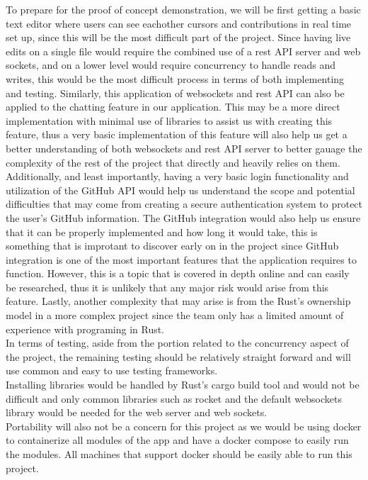 \documentclass{article}
\begin{document}
To prepare for the proof of concept demonstration, we will be first getting a basic text editor where users can see eachother cursors and contributions in real time set up, since this will be the most difficult part of the project.
Since having live edits on a single file would require the combined use of a rest API server and web sockets, and on a lower level would require concurrency to handle reads and writes, this would be the most difficult process in terms of 
both implementing and testing. Similarly, this application of websockets and rest API can also be applied to the chatting feature in our application. This may be a more direct implementation with minimal use of libraries to assist us with
creating this feature, thus a very basic implementation of this feature will also help us get a better understanding of both websockets and rest API server to better gauage the complexity of the rest of the project that directly and heavily
relies on them. Additionally, and least importantly, having a very basic login functionality and utilization of the GitHub API would help us understand the scope and potential difficulties that may come from creating a secure authentication
system to protect the user's GitHub information. The GitHub integration would also help us ensure that it can be properly implemented and how long it would take, this is something that is improtant to discover early on in the project since 
GitHub integration is one of the most important features that the application requires to function. However, this is a topic that is covered in depth online and can easily be researched, thus it is unlikely that any major risk would arise 
from this feature. Lastly, another complexity that may arise is from the Rust's ownership model in a more complex project since the team only has a limited amount of experience with programing in Rust.\\

In terms of testing, aside from the portion related to the concurrency aspect of the project, the remaining testing should be relatively straight forward and will use common and easy to use testing frameworks.\\

Installing libraries would be handled by Rust's cargo build tool and would not be difficult and only common libraries such as rocket and the default websockets library would be needed for the web server and web sockets.\\

Portability will also not be a concern for this project as we would be using docker to containerize all modules of the app and have a docker compose to easily run the modules. All machines that support docker should be easily able to run this
project.\\
\end{document}
